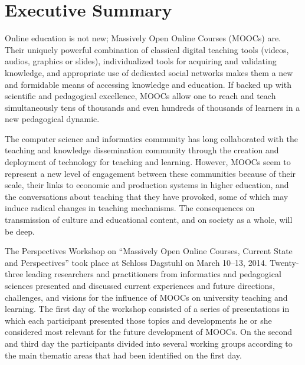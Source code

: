 
\section*{Executive Summary}





Online education is not new; Massively Open Online Courses (MOOCs)
are. Their uniquely powerful combination of classical digital teaching
tools (videos, audios, graphics or slides), individualized tools for
acquiring and validating knowledge, and appropriate use of dedicated
social networks makes them a new and formidable means of accessing
knowledge and education. If backed up with scientific and pedagogical
excellence, MOOCs allow one to reach and teach simultaneously tens of
thousands and even hundreds of thousands of learners in a new
pedagogical dynamic.

The computer science and informatics community has long collaborated
with the teaching and knowledge dissemination community through the
creation and deployment of technology for teaching and learning.
However, MOOCs seem to represent a new level of engagement between these
communities because of their scale, their links to economic and
production systems in higher education, and the conversations about
teaching that they have provoked, some of which may induce radical
changes in teaching mechanisms. The consequences on
transmission of culture and educational content, and on society as a
whole, will be deep.

The Perspectives Workshop on ``Massively Open Online Courses, Current
State and Perspectives'' took place at Schloss Dagstuhl on March 10--13,
2014. 
Twenty-three leading researchers and practitioners from
informatics and pedagogical sciences presented and discussed current
experiences and future directions, challenges, and visions for the
influence of MOOCs on university teaching and learning.
  The first day
of the workshop consisted of a series of presentations in which each
participant presented those topics and developments he or she considered
most relevant for the future development of MOOCs. On the second and
third day the participants divided into several working groups according
to the main thematic areas that had been identified on the first day.

